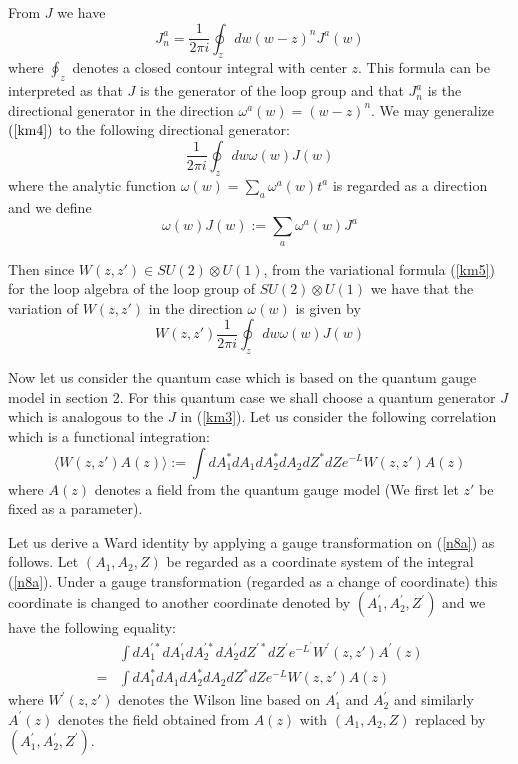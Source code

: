 \documentclass[a4paper,a4paper]{article}
\begin{document}
From $J$ we have 
\begin{equation}
J_n^a=  \frac{1}{2\pi i}\oint_z dw (w-z)^{n}J^a(w)  
\label{km4}
\end{equation}
where $\oint_z$ denotes a closed contour integral  with center $z$. This formula can be interpreted as that
$J$ is the generator of the loop group and that
$J_n^a$ is the directional generator in the direction
$\omega^a(w)= (w-z)^n$. We may generalize $(\ref{km4})$
to the following  directional generator: 
\begin{equation}
  \frac{1}{2\pi i}\oint_z dw \omega(w)J(w)  
\label{km5}
\end{equation}
where the analytic function 
$\omega(w)=\sum_a \omega^a(w)t^a$ is regarded
as a direction and we define
\begin{equation}
 \omega(w)J(w):= \sum_a \omega^a(w)J^a 
\label{km5a}
\end{equation}

Then since $W(z,z')\in SU(2)\otimes U(1)$,
from the variational formula (\ref{km5}) for the
loop algebra of the loop group of $SU(2)\otimes U(1)$ we have that the variation
of $W(z,z')$ in the direction $\omega(w)$
is given by
\begin{equation}
W(z,z')
  \frac{1}{2\pi i}\oint_z dw \omega(w)J(w)  
\label{km6}
\end{equation}
 

Now let us consider the quantum case which is based
on the quantum gauge model in section 2. For this quantum case
we shall choose a quantum generator $J$ which is
analogous to the $J$ in (\ref{km3}).
Let us consider the following correlation
which is a functional integration:
\begin{equation}
\langle W(z,z')A(z) \rangle :=  
\int dA_1^{*}dA_1dA_2^{*}dA_2dZ^{*}dZ  e^{-L} W(z,z')A(z)
\label{n8a}
\end{equation}
where $A(z)$ denotes a field from the quantum gauge
model (We first let $z'$ be fixed as a parameter). 

Let us derive a Ward identity by applying a gauge transformation on (\ref{n8a}) as follows.
Let $(A_1,A_2,Z)$ be regarded as a coordinate system of the integral
(\ref{n8a}). 
Under a gauge transformation (regarded as
a change of coordinate) this coordinate
is changed to another coordinate denoted by
$(A_1^{\prime}, A_2^{\prime}, Z^{\prime})$ 
and we have the following equality:
\begin{equation}
\begin{array}{rl}
& \int dA_1^{\prime *}dA_1^{\prime}
 dA_2^{\prime *}dA_2^{\prime}dZ^{\prime *}dZ^{\prime}
 e^{-L^{\prime}} W^{\prime}(z,z')A^{\prime}(z) \\
= &
\int dA_1^{*}dA_1dA_2^{*}dA_2dZ^{*}dZ  e^{-L} W(z,z')A(z)
\end{array}
\label{int}
\end{equation}
where $W^{\prime}(z,z')$ denotes the Wilson line
based on $A_1^{\prime}$ and $A_2^{\prime}$
and similarly $A^{\prime}(z)$ denotes  the
field obtained from $A(z)$ with $(A_1, A_2,Z)$ replaced
by $(A_1^{\prime}, A_2^{\prime},Z^{\prime})$.
 
\end{document}
